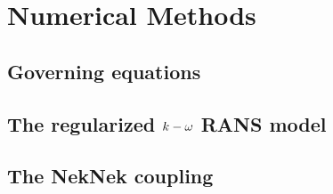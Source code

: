 \section{Numerical Methods}
\label{sec:nekrs}


\subsection{Governing equations}
\label{sec:nek1}

 

\subsection{The regularized $\lowercase{k}-\omega$ RANS model}
\label{sec:nek2}



\subsection{The NekNek coupling}
\label{sec:nek3}

